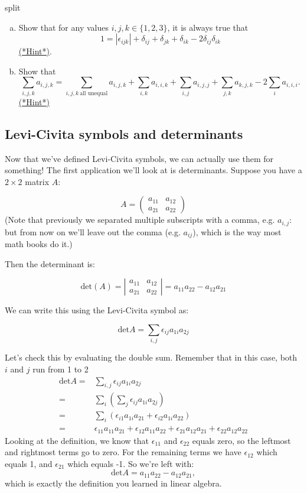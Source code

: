 \begin{exercise}{split}
\begin{enumerate}[(a)]
\item
Show that for any values $i,j,k \in \{1,2,3\}$, it is always true that 
\[ 1=|\epsilon_{ijk}|+\delta_{ij}+\delta_{jk}+\delta_{ik}-2\delta_{ij}\delta_{ik}\]
 \hyperref[sec:sigma:hints]{(*Hint*)}.   
\item
Show that 
\[
\sum_{i,j,k} a_{i,j,k}=\sum_{i,j,k~\text{all unequal}}a_{i,j,k}+\sum_{i,k}a_{i,i,k}+\sum_{i,j}a_{i,j,j}+\sum_{j,k}a_{k,j,k}-2\sum_{i}a_{i,i,i}.
\]
\hyperref[sec:sigma:hints]{(*Hint*)} 
\end{enumerate}
\end{exercise}


\subsection{Levi-Civita symbols and determinants}\label{subsec:LeviCivitaDet} 
Now that we've defined Levi-Civita symbols, we can actually use them for something!  The first application we'll look at is determinants.  Suppose you have a $2 \times 2 $ matrix $A$:

\[ A = \left( \begin{array}{cc}
a_{11} & a_{12} \\
a_{21} & a_{22} \end{array} \right) \]
\noindent
(Note that previously we separated multiple subscripts with a comma, e.g. $a_{i,j}$: but from now on we'll leave out the comma (e.g. $a_{ij}$), which is the way most math books do it.)

Then the determinant is:

\[ \text{det} (A) = 
 \left| \begin{array}{cc} a_{11} & a_{12} \\
a_{21} & a_{22} \end{array} \right|
= a_{11}a_{22} - a_{12}a_{21} \]

We can write this using the Levi-Civita symbol as:

\[ \text{det} A = \sum_{i,j} \epsilon_{ij} a_{1i} a_{2j} \]

Let's check this by evaluating the double sum. Remember that in this case, both $i$ and $j$ run from 1 to 2
\begin{align*}
\text{det} A =& \sum_{i,j} \epsilon_{ij} a_{1i} a_{2j} \\
=& \sum_{i} \left( \sum_{j} \epsilon_{ij} a_{1i} a_{2j}\right) \\
=& \sum_{i} \left( \epsilon_{i1} a_{1i} a_{21} + \epsilon_{i2} a_{1i} a_{22} \right) \\
=& \epsilon_{11} a_{11} a_{21} + \epsilon_{12} a_{11} a_{22} + \epsilon_{21} a_{12} a_{21} + \epsilon_{22} a_{12} a_{22}
\end{align*}
Looking at the definition, we know that $\epsilon_{11}$ and $\epsilon_{22}$ equals zero, so the leftmost and rightmost terms go to zero.   For the remaining terms we have $\epsilon_{12}$ which equals 1, and $\epsilon_{21}$ which equals -1.  So we're left with:
\[ \text{det} A = a_{11}a_{22} - a_{12}a_{21}, \]
which is exactly the definition you learned in linear algebra.   

